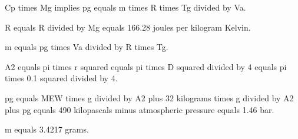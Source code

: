 Cp times Mg implies pg equals m times R times Tg divided by Va.  

R equals R divided by Mg equals 166.28 joules per kilogram Kelvin.  

m equals pg times Va divided by R times Tg.  

A2 equals pi times r squared equals pi times D squared divided by 4 equals pi times 0.1 squared divided by 4.  

pg equals MEW times g divided by A2 plus 32 kilograms times g divided by A2 plus pg equals 490 kilopascals minus atmospheric pressure equals 1.46 bar.  

m equals 3.4217 grams.